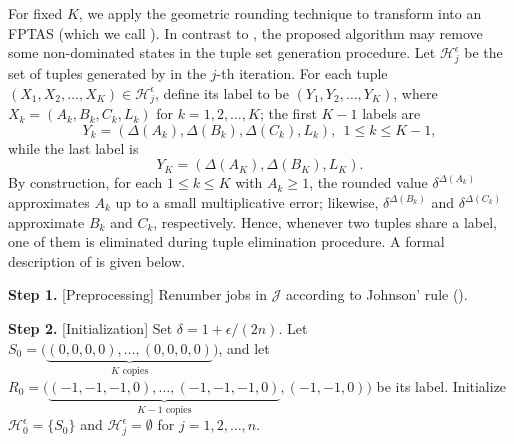 ﻿\documentclass[12pt]{article} \textheight=24.5cm \textwidth=16.5cm \parskip = 0.165cm
\begin{document}
\begin{sloppypar}
        For fixed $K$, we apply the geometric rounding technique to transform  into an FPTAS (which we call ).
        In contrast to , the proposed algorithm may remove some non-dominated states in the tuple set generation procedure.
        Let $\mathcal{H}_j^{\epsilon}$ be the set of tuples generated by  in the $j$-th iteration.
        For each tuple $(X_1, X_2, \ldots, X_K) \in \mathcal{H}_j^{\epsilon}$, define its label to be $(Y_1, Y_2, \ldots, Y_K)$, where $X_k=(A_k, B_k, C_k, L_k)$ for $k=1, 2, \ldots, K$; the first $K-1$ labels are
        \begin{equation*}
            Y_k=(\Delta(A_k), \Delta(B_k), \Delta(C_k), L_k), ~~ 1 \leq k \leq K-1,
        \end{equation*}
        while the last label is
        \begin{equation*}
            Y_K=(\Delta(A_K), \Delta(B_K), L_K).
        \end{equation*}
        By construction, for each $1 \leq k \leq K$ with $A_k \geq 1$, the rounded value $\delta^{\Delta(A_k)}$ approximates $A_k$ up to a small multiplicative error; likewise, $\delta^{\Delta(B_k)}$ and $\delta^{\Delta(C_k)}$ approximate $B_k$ and $C_k$, respectively.
        Hence, whenever two tuples share a label, one of them is eliminated during tuple elimination procedure.
        A formal description of  is given below.

        \begin{algorithm}[H]
            \small
            \linespread{1.2}\selectfont
            \SetAlgoLined
            \DontPrintSemicolon
            \caption{An FPTAS for $F2 \mid \mid C_{\max}^w$}  \label{alg-FPTAS}
            \BlankLine
            \textbf{Step 1.} [Preprocessing] Renumber jobs in $\mathcal{J}$ according to Johnson' rule (). \;

            \textbf{Step 2.} [Initialization] Set $\delta=1+\epsilon/(2n)$. Let  $S_0=\Big(\underbrace{(0,0,0,0),\ldots,(0,0,0,0)}_{K\text{ copies}}\Big)$, and let $R_0=\Big(\underbrace{(-1, -1, -1, 0),\ldots,(-1, -1, -1, 0)}_{K-1\text{ copies}}, (-1, -1, 0)\Big)$ be its label. Initialize $\mathcal{H}_0^{\epsilon}=\{S_0\}$ and $\mathcal{H}_j^{\epsilon}=\emptyset$ for $j=1, 2, \ldots, n$. \;


\end{algorithm}
\end{sloppypar}
\end{document}
